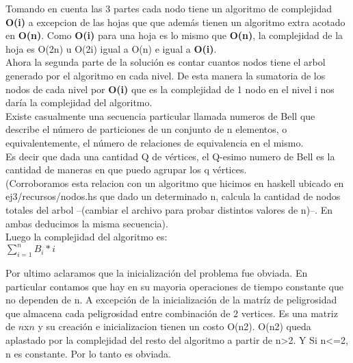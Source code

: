 \noindent 
Tomando en cuenta las 3 partes cada nodo tiene un algoritmo de complejidad \textbf{O(i)} a excepcion de las hojas que que adem\'as tienen un algoritmo extra acotado en \textbf{O(n)}. Como \textbf{O(i)} para una hoja es lo mismo que \textbf{O(n)}, la complejidad de la hoja es O(2n) u O(2i) igual a O(n) e igual a \textbf{O(i)}. \\

\noindent 
Ahora la segunda parte de la soluci\'on es contar cuantos nodos tiene el arbol generado por el algoritmo en cada nivel. De esta manera la sumatoria de los nodos de cada nivel por \textbf{O(i)} que es la complejidad de 1 nodo en el nivel i nos dar\'ia la complejidad del algoritmo.\\

\noindent 
Existe casualmente una secuencia particular llamada numeros de Bell que describe el número de particiones de un conjunto de n elementos, o equivalentemente, el número de relaciones de equivalencia en el mismo. \\
Es decir que dada una cantidad Q de v\'ertices, el Q-esimo numero de Bell es la cantidad de maneras en que puedo agrupar los q v\'ertices.\\
(Corroboramos esta relacion con un algoritmo que hicimos en haskell ubicado en ej3/recursos/nodos.hs que dado un determinado n, calcula la cantidad de nodos totales del arbol --(cambiar el archivo para probar distintos valores de n)--. En ambas deducimos la misma secuencia).\\

\noindent 
Luego la complejidad del algoritmo es: \\
$\sum\limits_{i{{=}}1}^n B_{i}*i$

\noindent 
Por ultimo aclaramos que la inicializaci\'on del problema fue obviada. En particular contamos que hay en su mayoria operaciones de tiempo constante que no dependen de n. A excepci\'on de la inicializaci\'on de la matr\'iz de peligrosidad que almacena cada peligrosidad entre combinaci\'on de 2 vertices. Es una matriz de $n$x$n$ y su creaci\'on e inicializacion tienen un costo O(n2). O(n2) queda aplastado por la complejidad del resto del algoritmo a partir de n>2. Y Si n<=2, n es constante. Por lo tanto es obviada.


